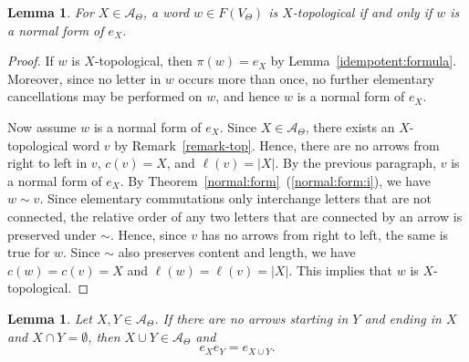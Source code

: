 \documentclass[pdflatex,sn-mathphys-num]{sn-jnl}
\newtheorem{lemma}[theorem]{Lemma}
\theoremstyle{definition}
\theoremstyle{remark}
\begin{document}
\begin{lemma}\label{X-top}
   For $X \in \mathcal{A}_{\Theta}$, a word $w \in F(V_{\Theta})$ is $X$-topological if and only if $w$ is a normal form of $e_X$.
\end{lemma}

\begin{proof}
   If $w$ is $X$-topological, then $\pi(w) = e_X$ by Lemma~\ref{idempotent:formula}.
   Moreover, since no letter in $w$ occurs more than once, no further elementary cancellations may be performed on $w$, and hence $w$ is a normal form of $e_X$.

   Now assume $w$ is a normal form of $e_X$.
   Since $X \in \mathcal{A}_{\Theta}$, there exists an $X$-topological word $v$ by Remark~\ref{remark-top}.
   Hence, there are no arrows from right to left in $v$, $c(v) = X$, and $\ell(v) = |X|$.
   By the previous paragraph, $v$ is a normal form of $e_X$.
   By Theorem~\ref{normal:form}~(\ref{normal:form:i}), we have $w \sim v$.
   Since elementary commutations only interchange letters that are not connected, the relative order of any two letters that are connected by an arrow is preserved under $\sim$.
   Hence, since $v$ has no arrows from right to left, the same is true for $w$.
   Since $\sim$ also preserves content and length, we have $c(w) = c(v) = X$ and $\ell(w) = \ell(v) = |X|$.
   This implies that $w$ is $X$-topological.
\end{proof}

\begin{lemma}\label{IDS:no_arrows}
   Let $X, Y \in \mathcal{A}_{\Theta}$.
   If there are no arrows starting in $Y$ and ending in $X$ and $X \cap Y = \emptyset$, then $X \cup Y \in \mathcal{A}_{\Theta}$ and
   \[
   e_X e_Y = e_{X \cup Y}.
   \]
\end{lemma}
\end{document}
